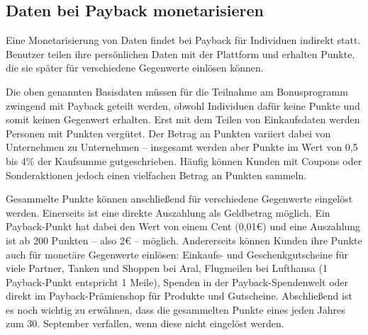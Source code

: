 \subsection{Daten bei Payback monetarisieren}
Eine Monetarisierung von Daten findet bei Payback für Individuen indirekt statt. Benutzer teilen ihre persönlichen Daten mit der Plattform und erhalten Punkte, die sie später für verschiedene Gegenwerte einlösen können. \newline

\noindent Die oben genannten Basisdaten müssen für die Teilnahme am Bonusprogramm zwingend mit Payback geteilt werden, obwohl Individuen dafür keine Punkte und somit keinen Gegenwert erhalten. Erst mit dem Teilen von Einkaufsdaten werden Personen mit Punkten vergütet. Der Betrag an Punkten variiert dabei von Unternehmen zu Unternehmen -- insgesamt werden aber Punkte im Wert von 0,5 bis 4\% der Kaufsumme gutgeschrieben. Häufig können Kunden mit Coupons oder Sonderaktionen jedoch einen vielfachen Betrag an Punkten sammeln. \newline

\noindent Gesammelte Punkte können anschließend für verschiedene Gegenwerte eingelöst werden. Einerseits ist eine direkte Auszahlung als Geldbetrag möglich. Ein Payback-Punkt hat dabei den Wert von einem Cent (0,01€) und eine Auszahlung ist ab 200 Punkten -- also 2€ -- möglich. \cite{Payback_Teilnahme} Andererseits können Kunden ihre Punkte auch für monetäre Gegenwerte einlösen: Einkaufs- und Geschenkgutscheine für viele Partner, Tanken und Shoppen bei Aral, Flugmeilen bei Lufthansa (1 Payback-Punkt entspricht 1 Meile), Spenden in der Payback-Spendenwelt oder direkt im Payback-Prämienshop für Produkte und Gutscheine. \cite{Payback_Einlösen} Abschließend ist es noch wichtig zu erwähnen, dass die gesammelten Punkte eines jeden Jahres zum 30. September verfallen, wenn diese nicht eingelöst werden. \cite{Payback_Teilnahme}
